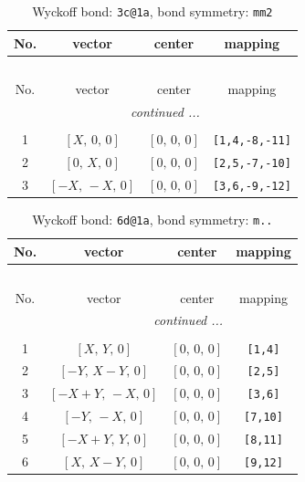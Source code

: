 \documentclass[fleqn,8pt]{jsarticle}
\begin{document}
\renewcommand{\arraystretch}{1.2}
\begin{longtable}{cccc}
\caption{Wyckoff bond: {\tt 3c@1a}, bond symmetry: {\tt mm2}}
 \\
 \hline \hline
No. & vector & center & mapping \\ \hline \endfirsthead

\multicolumn{3}{l}{\tablename\ \thetable{}} \\
 \hline \hline
No. & vector & center & mapping \\ \hline \endhead

 \hline \hline
\multicolumn{3}{r}{\footnotesize\it continued ...} \\ \endfoot

 \hline \hline
\multicolumn{3}{r}{} \\ \endlastfoot

1 & $\left[ X,\, 0,\, 0 \right]$ & $\left[ 0,\, 0,\, 0 \right]$ & {\tt [1,4,-8,-11]} \\ \hline
2 & $\left[ 0,\, X,\, 0 \right]$ & $\left[ 0,\, 0,\, 0 \right]$ & {\tt [2,5,-7,-10]} \\ \hline
3 & $\left[ - X,\, - X,\, 0 \right]$ & $\left[ 0,\, 0,\, 0 \right]$ & {\tt [3,6,-9,-12]} \\
\end{longtable}
\renewcommand{\arraystretch}{1.2}
\begin{longtable}{cccc}
\caption{Wyckoff bond: {\tt 6d@1a}, bond symmetry: {\tt m..}}
 \\
 \hline \hline
No. & vector & center & mapping \\ \hline \endfirsthead

\multicolumn{3}{l}{\tablename\ \thetable{}} \\
 \hline \hline
No. & vector & center & mapping \\ \hline \endhead

 \hline \hline
\multicolumn{3}{r}{\footnotesize\it continued ...} \\ \endfoot

 \hline \hline
\multicolumn{3}{r}{} \\ \endlastfoot

1 & $\left[ X,\, Y,\, 0 \right]$ & $\left[ 0,\, 0,\, 0 \right]$ & {\tt [1,4]} \\ \hline
2 & $\left[ - Y,\, X - Y,\, 0 \right]$ & $\left[ 0,\, 0,\, 0 \right]$ & {\tt [2,5]} \\ \hline
3 & $\left[ - X + Y,\, - X,\, 0 \right]$ & $\left[ 0,\, 0,\, 0 \right]$ & {\tt [3,6]} \\ \hline
4 & $\left[ - Y,\, - X,\, 0 \right]$ & $\left[ 0,\, 0,\, 0 \right]$ & {\tt [7,10]} \\ \hline
5 & $\left[ - X + Y,\, Y,\, 0 \right]$ & $\left[ 0,\, 0,\, 0 \right]$ & {\tt [8,11]} \\ \hline
6 & $\left[ X,\, X - Y,\, 0 \right]$ & $\left[ 0,\, 0,\, 0 \right]$ & {\tt [9,12]} \\
\end{longtable}
\end{document}
